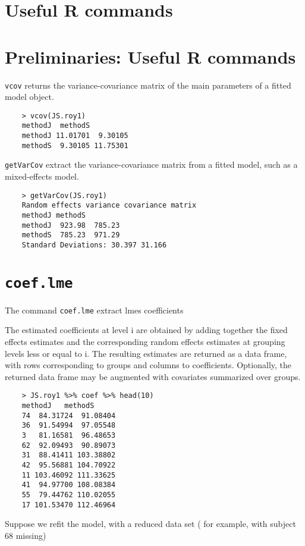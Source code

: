 \documentclass[Main.tex]{subfiles}
\begin{document}
			\section{Useful R commands} 
			


\section{Preliminaries: Useful R commands}


\texttt{vcov} returns the variance-covariance matrix of the main parameters of a fitted model object.
\begin{framed}
	\begin{verbatim}
	> vcov(JS.roy1)
	methodJ  methodS
	methodJ 11.01701  9.30105
	methodS  9.30105 11.75301
	\end{verbatim}
\end{framed}

\texttt{getVarCov} extract the variance-covariance matrix from a fitted model, such as a mixed-effects model.
\begin{framed}
	\begin{verbatim}
	> getVarCov(JS.roy1)
	Random effects variance covariance matrix
	methodJ methodS
	methodJ  923.98  785.23
	methodS  785.23  971.29
	Standard Deviations: 30.397 31.166 
	\end{verbatim}
\end{framed}	
\section{\texttt{coef.lme}}

The command \texttt{coef.lme} extract lmes coefficients


The estimated coefficients at level i are obtained by adding together the fixed effects estimates and the corresponding random effects estimates at grouping levels less or equal to i. The resulting estimates are returned as a data frame, with rows corresponding to groups and columns to coefficients. Optionally, the returned data frame may be augmented with covariates summarized over groups.
\begin{framed}
	\begin{verbatim}
	> JS.roy1 %>% coef %>% head(10)
	methodJ   methodS
	74  84.31724  91.08404
	36  91.54994  97.05548
	3   81.16581  96.48653
	62  92.09493  90.89073
	31  88.41411 103.38802
	42  95.56881 104.70922
	11 103.46092 111.33625
	41  94.97700 108.08384
	55  79.44762 110.02055
	17 101.53470 112.46964
	\end{verbatim}
\end{framed}
Suppose we refit the model, with a reduced data set ( for example, with subject 68 missing)
\end{document}

